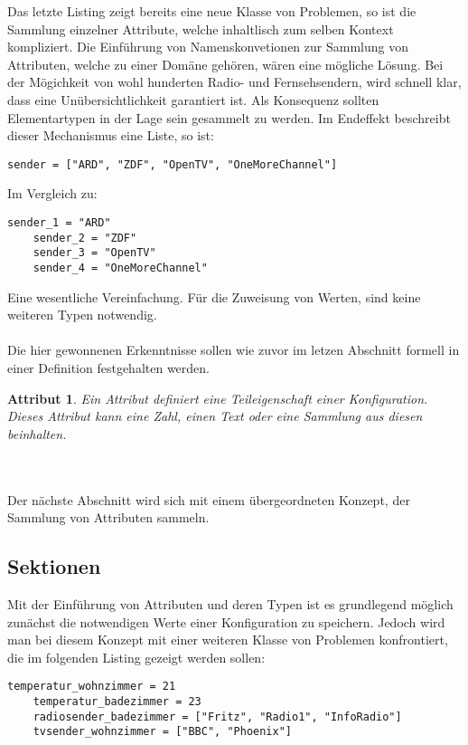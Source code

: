 Das letzte Listing zeigt bereits eine neue Klasse von Problemen, so ist die Sammlung einzelner Attribute, welche inhaltlisch zum selben Kontext kompliziert. Die Einführung von Namenskonvetionen zur Sammlung von Attributen, welche zu einer Domäne gehören, wären eine mögliche Lösung. Bei der Mögichkeit von wohl hunderten Radio- und Fernsehsendern, wird schnell klar, dass eine Unübersichtlichkeit garantiert ist. 	Als Konsequenz sollten Elementartypen in der Lage sein gesammelt zu werden. Im Endeffekt beschreibt dieser Mechanismus eine Liste, so ist:

\lstset{language=bash}
\begin{lstlisting}[caption=Sammlung mehrerer Attribute in einer Liste, captionpos=b]
   sender = ["ARD", "ZDF", "OpenTV", "OneMoreChannel"]
\end{lstlisting}

Im Vergleich zu: 

\lstset{language=bash}
\begin{lstlisting}[caption=Sammlung mehrerer Werte ohne Liste, captionpos=b]
  sender_1 = "ARD"
	sender_2 = "ZDF"
	sender_3 = "OpenTV"
	sender_4 = "OneMoreChannel"
\end{lstlisting}


Eine wesentliche Vereinfachung. Für die Zuweisung von Werten, sind keine weiteren Typen notwendig. 
\\\\
Die hier gewonnenen Erkenntnisse sollen wie zuvor im letzen Abschnitt formell in einer Definition festgehalten werden.

\newtheorem{mydef}{Attribut}
\begin{mydef}
Ein Attribut definiert eine Teileigenschaft einer Konfiguration. Dieses Attribut kann eine Zahl, einen Text oder eine Sammlung aus diesen beinhalten.
\end{mydef}
\\\\
Der nächste Abschnitt wird sich mit einem übergeordneten Konzept, der Sammlung von Attributen sammeln.


\subsection{Sektionen}
Mit der Einführung von Attributen und deren Typen ist es grundlegend möglich zunächst die notwendigen Werte einer Konfiguration zu speichern. Jedoch wird man bei diesem Konzept mit einer weiteren Klasse von Problemen konfrontiert, die im folgenden Listing gezeigt werden sollen:
\lstset{language=bash}
\begin{lstlisting}[caption=Attributssammlung ohne Sektionen, captionpos=b]
  temperatur_wohnzimmer = 21
	temperatur_badezimmer = 23
	radiosender_badezimmer = ["Fritz", "Radio1", "InfoRadio"]
	tvsender_wohnzimmer = ["BBC", "Phoenix"]
\end{lstlisting}

